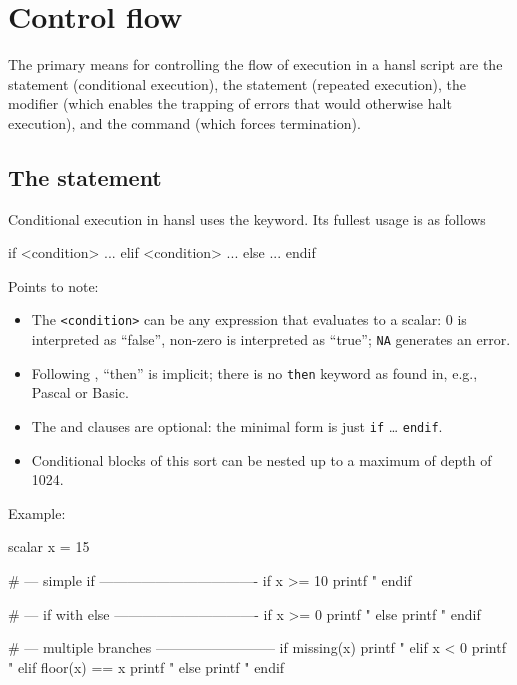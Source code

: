 \chapter{Control flow}
\label{chap:hp-ctrlflow}

The primary means for controlling the flow of execution in a hansl
script are the  statement (conditional execution), the
 statement (repeated execution), the  modifier
(which enables the trapping of errors that would otherwise halt
execution), and the  command (which forces termination).

\section{The  statement}

Conditional execution in hansl uses the  keyword. Its fullest
usage is as follows
\begin{code}
if <condition>
   ...
elif <condition>
   ...
else 
   ...
endif  
\end{code}

Points to note:
\begin{itemize}
\item The \texttt{<condition>} can be any expression that evaluates to a
  scalar: 0 is interpreted as ``false'', non-zero is interpreted as
  ``true''; \texttt{NA} generates an error.
\item Following , ``then'' is implicit; there is no \texttt{then}
  keyword as found in, e.g., Pascal or Basic.
\item The  and  clauses are optional: the minimal
  form is just \texttt{if} \dots{} \texttt{endif}.
\item Conditional blocks of this sort can be nested up to a maximum of
  depth of 1024.
\end{itemize}

Example:
\begin{code}
scalar x = 15

# --- simple if ----------------------------------
if x >= 10
   printf "%
endif

# --- if with else -------------------------------
if x >= 0
   printf "%
else
   printf "%
endif

# --- multiple branches --------------------------
if missing(x)
   printf "%
elif x < 0
   printf "%
elif floor(x) == x
   printf "%
else
   printf "%
endif
\end{code}

